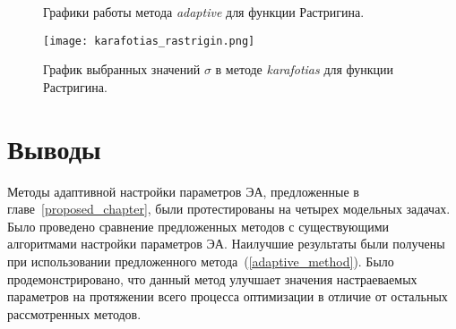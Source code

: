 \begin{figure}
  \centering
  \caption{ Графики работы метода \textit{adaptive} для функции Растригина.}
  \label{adaptive_rastrigin_plot}
\end{figure}

\begin{figure}
  \centering
  \texttt{[image: karafotias\_rastrigin.png]}
  \caption{График выбранных значений $\sigma$ в методе \textit{karafotias} для функции Растригина.}
  \label{karafotias_rastrigin}
\end{figure}

\section{Выводы}

Методы адаптивной настройки параметров ЭА, предложенные в главе~\ref{proposed_chapter}, были протестированы на четырех модельных задачах. Было проведено сравнение предложенных методов с существующими алгоритмами настройки параметров ЭА. Наилучшие результаты были получены при использовании предложенного метода~(\ref{adaptive_method}). Было продемонстрировано, что данный метод улучшает значения настраеваемых параметров на протяжении всего процесса оптимизации в отличие от остальных рассмотренных методов.